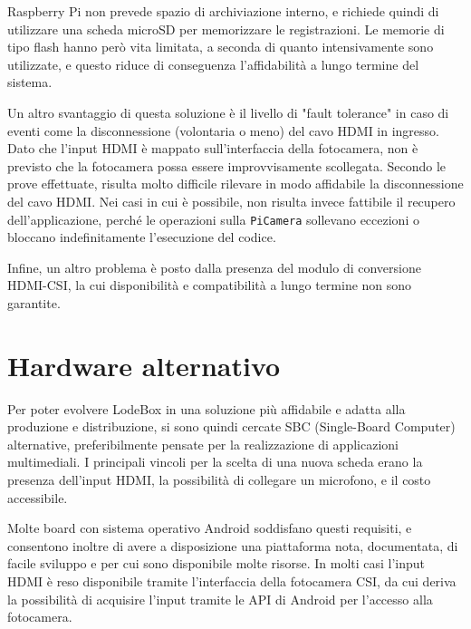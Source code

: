 Raspberry Pi non prevede spazio di archiviazione interno, e richiede quindi di utilizzare una scheda microSD per memorizzare le registrazioni. Le memorie di tipo flash hanno però vita limitata, a seconda di quanto intensivamente sono utilizzate, e questo riduce di conseguenza l'affidabilità a lungo termine del sistema.

Un altro svantaggio di questa soluzione è il livello di "fault tolerance" in caso di eventi come la disconnessione (volontaria o meno) del cavo HDMI in ingresso. Dato che l'input HDMI è mappato sull'interfaccia della fotocamera, non è previsto che la fotocamera possa essere improvvisamente scollegata. Secondo le prove effettuate, risulta molto difficile rilevare in modo affidabile la disconnessione del cavo HDMI. Nei casi in cui è possibile, non risulta invece fattibile il recupero dell'applicazione, perché le operazioni sulla \texttt{PiCamera} sollevano eccezioni o bloccano indefinitamente l'esecuzione del codice.

Infine, un altro problema è posto dalla presenza del modulo di conversione HDMI-CSI, la cui disponibilità e compatibilità a lungo termine non sono garantite.

\section{Hardware alternativo}
\label{sec:intro_hardware}

Per poter evolvere LodeBox in una soluzione più affidabile e adatta alla produzione e distribuzione, si sono quindi cercate SBC (Single-Board Computer) alternative, preferibilmente pensate per la realizzazione di applicazioni multimediali. I principali vincoli per la scelta di una nuova scheda erano la presenza dell'input HDMI, la possibilità di collegare un microfono, e il costo accessibile.

Molte board con sistema operativo Android soddisfano questi requisiti, e consentono inoltre di avere a disposizione una piattaforma nota, documentata, di facile sviluppo e per cui sono disponibile molte risorse. In molti casi l'input HDMI è reso disponibile tramite l'interfaccia della fotocamera CSI, da cui deriva la possibilità di acquisire l'input tramite le API di Android per l'accesso alla fotocamera.

